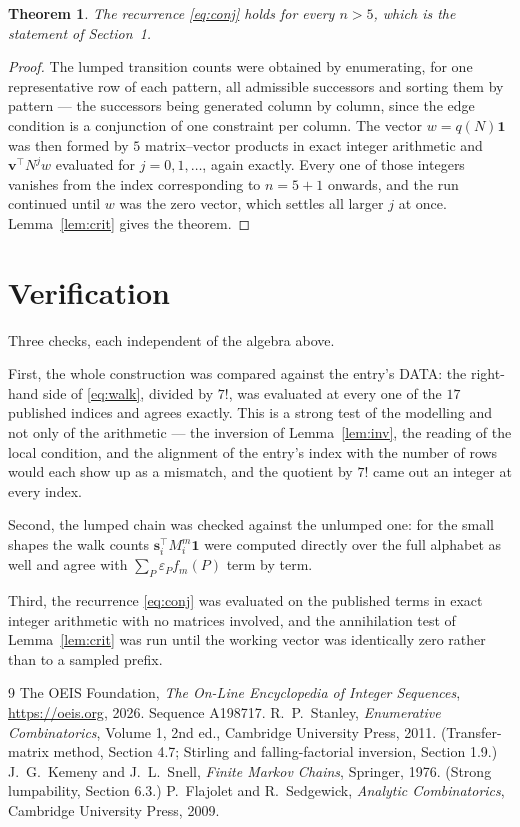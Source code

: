 \documentclass[11pt,a4paper]{article}
\theoremstyle{plain}
\newtheorem{theorem}{Theorem}
\theoremstyle{definition}
\begin{document}
\begin{theorem}
The recurrence \eqref{eq:conj} holds for every $n>5$, which is the statement of
Section~1.
\end{theorem}

\begin{proof}
The lumped transition counts were obtained by enumerating, for one representative row of
each pattern, all admissible successors and sorting them by pattern --- the successors being
generated column by column, since the edge condition is a conjunction of one constraint per
column. The vector $w=q(N)\mathbf{1}$ was then formed by $5$ matrix--vector products
in exact integer arithmetic and $\mathbf{v}^{\!\top}N^{j}w$ evaluated for
$j=0,1,\dots$, again exactly. Every one of those integers vanishes from the index
corresponding to $n=5+1$ onwards, and the run continued until $w$ was the zero vector,
which settles all larger $j$ at once. Lemma~\ref{lem:crit} gives the theorem.
\end{proof}

\section{Verification}

Three checks, each independent of the algebra above.

First, the whole construction was compared against the entry's DATA: the right-hand side of
\eqref{eq:walk}, divided by $7!$, was evaluated at every one of the $17$
published indices and agrees exactly. This is a strong test of the modelling and not only of
the arithmetic --- the inversion of Lemma~\ref{lem:inv}, the reading of the local
condition, and the alignment of the entry's index with the number of rows would each
show up as a mismatch, and the quotient by $7!$ came out an integer at every index.

Second, the lumped chain was checked against the unlumped one: for the small shapes the walk
counts $\mathbf{s}_i^{\!\top}M_i^{m}\mathbf{1}$ were computed directly over the full
alphabet as well and agree with $\sum_P\varepsilon_Pf_m(P)$ term by term.

Third, the recurrence \eqref{eq:conj} was evaluated on the published terms in exact integer
arithmetic with no matrices involved, and the annihilation test of Lemma~\ref{lem:crit} was
run until the working vector was identically zero rather than to a sampled prefix.

\begin{thebibliography}{9}
 The OEIS Foundation, \emph{The On-Line Encyclopedia of Integer
Sequences}, \url{https://oeis.org}, 2026. Sequence A198717.
 R.~P.~Stanley, \emph{Enumerative Combinatorics}, Volume 1, 2nd ed.,
Cambridge University Press, 2011. (Transfer-matrix method, Section 4.7; Stirling and
falling-factorial inversion, Section 1.9.)
 J.~G.~Kemeny and J.~L.~Snell, \emph{Finite Markov Chains}, Springer,
1976. (Strong lumpability, Section 6.3.)
 P.~Flajolet and R.~Sedgewick, \emph{Analytic Combinatorics}, Cambridge
University Press, 2009.
\end{thebibliography}
\end{document}
